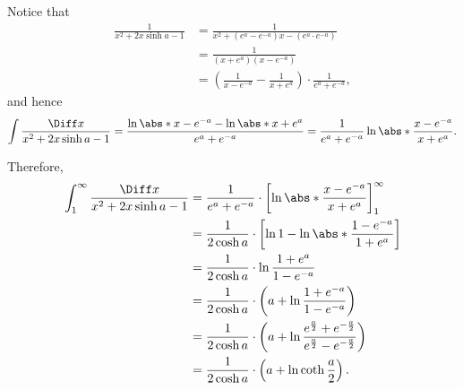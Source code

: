 \begin{enumerate}
          Notice that
          \begin{align*}
              \frac{1}{x^2 + 2x \sinh a - 1} & = \frac{1}{x^2 + (e^a - e^{-a})x - (e^a \cdot e^{-a})}                                \\
                                             & = \frac{1}{(x + e^a) (x - e^{-a})}                                                    \\
                                             & = \left(\frac{1}{x - e^{-a}} - \frac{1}{x + e^a}\right) \cdot \frac{1}{e^a + e^{-a}},
          \end{align*}
          and hence
          \[
              \int \frac{\Diff x}{x^2 + 2x \sinh a - 1} = \frac{\ln \abs*{x - e^{-a}} - \ln \abs*{x + e^a}}{e^a + e^{-a}} = \frac{1}{e^a + e^{-a}} \ln \abs*{\frac{x - e^{-a}}{x + e^a}}.
          \]

          Therefore,
          \begin{align*}
              \int_{1}^{\infty} \frac{\Diff x}{x^2 + 2x \sinh a - 1} & = \frac{1}{e^a + e^{-a}} \cdot \left[\ln \abs*{\frac{x - e^{-a}}{x + e^a}}\right]_{1}^{\infty}                                 \\
                                                                     & = \frac{1}{2 \cosh a} \cdot \left[\ln 1 - \ln \abs*{\frac{1 - e^{-a}}{1 + e^a}}\right]                                         \\
                                                                     & = \frac{1}{2 \cosh a} \cdot \ln \frac{1 + e^a}{1 - e^{-a}}                                                                     \\
                                                                     & = \frac{1}{2 \cosh a} \cdot \left(a + \ln \frac{1 + e^{-a}}{1 - e^{-a}}\right)                                                 \\
                                                                     & = \frac{1}{2 \cosh a} \cdot \left(a + \ln \frac{e^{\frac{a}{2}} + e^{-\frac{a}{2}}}{e^{\frac{a}{2}} - e^{-\frac{a}{2}}}\right) \\
                                                                     & = \frac{1}{2 \cosh a} \cdot \left(a + \ln \coth \frac{a}{2}\right).
          \end{align*}


\end{enumerate}
